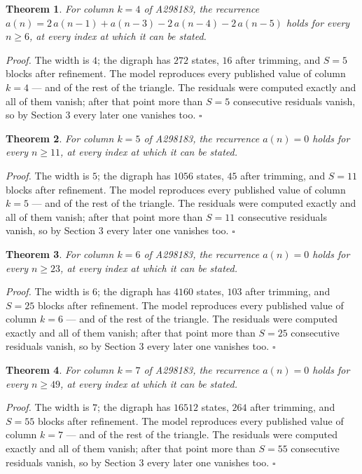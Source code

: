 \documentclass[11pt]{article}
\newtheorem{theorem}{Theorem}
\theoremstyle{definition}
\begin{document}
\begin{theorem} For column $k = 4$ of A298183, the recurrence $a(n) = 2\,a(n-1) + a(n-3) - 2\,a(n-4) - 2\,a(n-5)$ holds for every $n \ge 6$, at every index at which it can be stated.\end{theorem}

{\itshape Proof.} The width is $4$; the digraph has $272$ states, $16$ after trimming, and $S = 5$ blocks after refinement. The model reproduces every published value of column $k = 4$ --- and of the rest of the triangle. The residuals were computed exactly and all of them vanish; after that point more than $S = 5$ consecutive residuals vanish, so by Section 3 every later one vanishes too. $\square$

\begin{theorem} For column $k = 5$ of A298183, the recurrence $a(n) = 0$ holds for every $n \ge 11$, at every index at which it can be stated.\end{theorem}

{\itshape Proof.} The width is $5$; the digraph has $1056$ states, $45$ after trimming, and $S = 11$ blocks after refinement. The model reproduces every published value of column $k = 5$ --- and of the rest of the triangle. The residuals were computed exactly and all of them vanish; after that point more than $S = 11$ consecutive residuals vanish, so by Section 3 every later one vanishes too. $\square$

\begin{theorem} For column $k = 6$ of A298183, the recurrence $a(n) = 0$ holds for every $n \ge 23$, at every index at which it can be stated.\end{theorem}

{\itshape Proof.} The width is $6$; the digraph has $4160$ states, $103$ after trimming, and $S = 25$ blocks after refinement. The model reproduces every published value of column $k = 6$ --- and of the rest of the triangle. The residuals were computed exactly and all of them vanish; after that point more than $S = 25$ consecutive residuals vanish, so by Section 3 every later one vanishes too. $\square$

\begin{theorem} For column $k = 7$ of A298183, the recurrence $a(n) = 0$ holds for every $n \ge 49$, at every index at which it can be stated.\end{theorem}

{\itshape Proof.} The width is $7$; the digraph has $16512$ states, $264$ after trimming, and $S = 55$ blocks after refinement. The model reproduces every published value of column $k = 7$ --- and of the rest of the triangle. The residuals were computed exactly and all of them vanish; after that point more than $S = 55$ consecutive residuals vanish, so by Section 3 every later one vanishes too. $\square$
\end{document}
